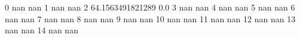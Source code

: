 0 nan nan
1 nan nan
2 64.1563491821289 0.0
3 nan nan
4 nan nan
5 nan nan
6 nan nan
7 nan nan
8 nan nan
9 nan nan
10 nan nan
11 nan nan
12 nan nan
13 nan nan
14 nan nan

